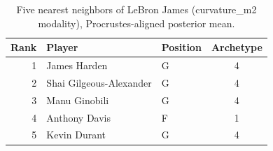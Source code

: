 \begin{table}[htbp]
  \centering\small
  \begin{tabular}{rllc}
    \toprule
    Rank & Player & Position & Archetype \\
    \midrule
    1 & James Harden & G & 4 \\
    2 & Shai Gilgeous-Alexander & G & 4 \\
    3 & Manu Ginobili & G & 4 \\
    4 & Anthony Davis & F & 1 \\
    5 & Kevin Durant & G & 4 \\
    \bottomrule
  \end{tabular}
  \caption{Five nearest neighbors of LeBron James (curvature_m2 modality), Procrustes-aligned posterior mean.}
  \label{tab:LeBron_James_neighbors_curvature_m2}
\end{table}

